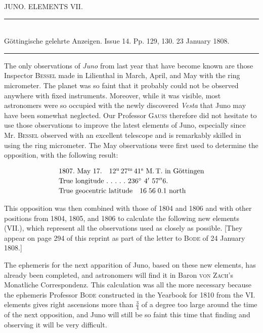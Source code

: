 \centerline{JUNO. ELEMENTS VII.}

\begin{center}
\rule{0.5\linewidth}{0.4pt}\\[2pt]
Göttingische gelehrte Anzeigen. Issue 14. Pp. 129, 130. 23 January 1808.\\[2pt]
\rule{0.5\linewidth}{0.4pt}
\end{center}

\par\indent The only observations of \emph{Juno} from last year that have become known are those Inspector \textsc{Bessel} made in Lilienthal in March, April, and May with the ring micrometer. The planet was so faint that it probably could not be observed anywhere with fixed instruments. Moreover, while it was visible, most astronomers were so occupied with the newly discovered \emph{Vesta} that Juno may have been somewhat neglected. Our Professor \textsc{Gauss} therefore did not hesitate to use those observations to improve the latest elements of Juno, especially since Mr. \textsc{Bessel} observed with
an excellent telescope and is remarkably skilled in using the ring micrometer. The May observations were first used to determine the opposition, with the following result:

\[
\begin{array}{l}
1807.\ \text{May}\ 17.\quad 12^{\text{u}}\,27^{\text{m}}\,41^{\text{s}}\ \text{M.\,T. in Göttingen}\\[2pt]
\text{True longitude}\ .\ .\ .\ .\ .\ 236^\circ\ 4'\ 57''6.\\[2pt]
\text{True geocentric latitude}\quad 16\;56\;0.1\ \text{north}
\end{array}
\]\par\indent This opposition was then combined with those of 1804 and 1806 and with other positions from 1804, 1805, and 1806 to calculate the following new elements (VII.), which represent all the observations used as closely as possible. [They appear on page 294 of this reprint as part of the letter to \textsc{Bode} of 24 January 1808.]\par\indent The ephemeris for the next apparition of Juno, based on these new elements, has already been completed, and astronomers will find it in Baron \textsc{von Zach}’s Monatliche Correspondenz. This calculation was all the more necessary because the ephemeris Professor \textsc{Bode} constructed in the Yearbook for 1810 from the VI. elements gives right ascensions more than $\frac{3}{4}$ of a degree too large around the time of the next opposition, and Juno will still be so faint this time that finding and observing it will be very difficult.
